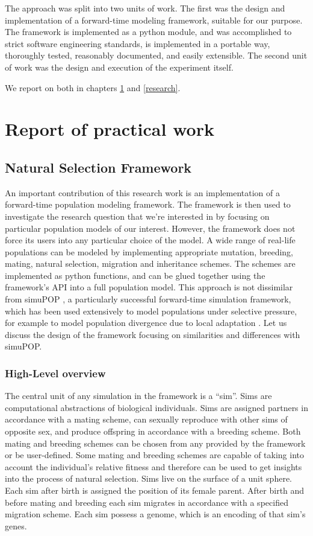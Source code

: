 \documentclass{l4proj}
\begin{document}
The approach was split into two units of work. The first was the design and implementation of a forward-time modeling framework, suitable for our purpose. The framework is implemented as a python module, and was accomplished to strict software engineering standards, is implemented in a portable way, thoroughly tested, reasonably documented, and easily extensible. The second unit of work was the design and execution of the experiment itself.

We report on both in chapters \ref{practical} and \ref{research}.



\chapter{Report of practical work}\label{practical}

\section{Natural Selection Framework}
An important contribution of this research work is an implementation of a forward-time population modeling framework. The framework is then used to investigate the research question that we're interested in by focusing on particular population models of our interest. However, the framework does not force its users into any particular choice of the model. A wide range of real-life populations can be modeled by implementing appropriate mutation, breeding, mating, natural selection, migration and inheritance schemes. The schemes are implemented as python functions, and can be glued together using the framework's API into a full population model. This approach is not dissimilar from simuPOP \parencite{peng05}, a particularly successful forward-time simulation framework, which has been used extensively to model populations under selective pressure, for example to model population divergence due to local adaptation \parencite{naturalSelectionSignatures16}. Let us discuss the design of the framework focusing on similarities and differences with simuPOP.

\subsection{High-Level overview}
The central unit of any simulation in the framework is a ``sim''. Sims are computational abstractions of biological individuals. Sims are assigned partners in accordance with a mating scheme, can sexually reproduce with other sims of opposite sex, and produce offspring in accordance with a breeding scheme. Both mating and breeding schemes can be chosen from any provided by the framework or be user-defined. Some mating and breeding schemes are capable of taking into account the individual's relative fitness and therefore can be used to get insights into the process of natural selection. Sims live on the surface of a unit sphere. Each sim after birth is assigned the position of its female parent. After birth and before mating and breeding each sim migrates in accordance with a specified migration scheme. Each sim possess a genome, which is an encoding of that sim's genes.
\end{document}
